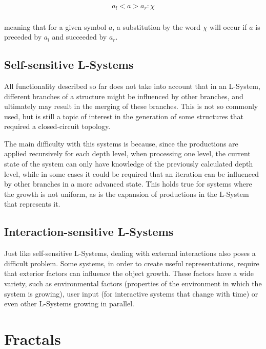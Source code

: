 \documentclass{acmtog}
\begin{document}
\begin{eqnarray*}
  a_{l} < a > a_{r} : \chi \\
\end{eqnarray*}

meaning that for a given symbol $a$, a substitution by the word $\chi$ will occur if $a$ is preceded by $a_{l}$ and succeeded by $a_{r}$.


\subsection{Self-sensitive L-Systems}
\label{subsec:selfsensitive}

All functionality described so far does not take into account that in an L-System, different branches of a structure might be influenced by other branches, and ultimately may result in the merging of these branches. This is not so commonly used, but is still a topic of interest in the generation of some structures that required a closed-circuit topology.

The main difficulty with this systems is because, since the productions are applied recursively for each depth level, when processing one level, the current state of the system can only have knowledge of the previously calculated depth level, while in some cases it could be required that an iteration can be influenced by other branches in a more advanced state. This holds true for systems where the growth is not uniform, as is the expansion of productions in the L-System that represents it.

\subsection{Interaction-sensitive L-Systems}
\label{subsec:interactionsensitive}

Just like self-sensitive L-Systems, dealing with external interactions also poses a difficult problem. Some systems, in order to create useful representations, require that exterior factors can influence the object growth. These factors have a wide variety, such as environmental factors (properties of the environment in which the system is growing), user input (for interactive systems that change with time) or even other L-Systems growing in parallel.

\section{Fractals}
\label{sec:fractals}
\end{document}
